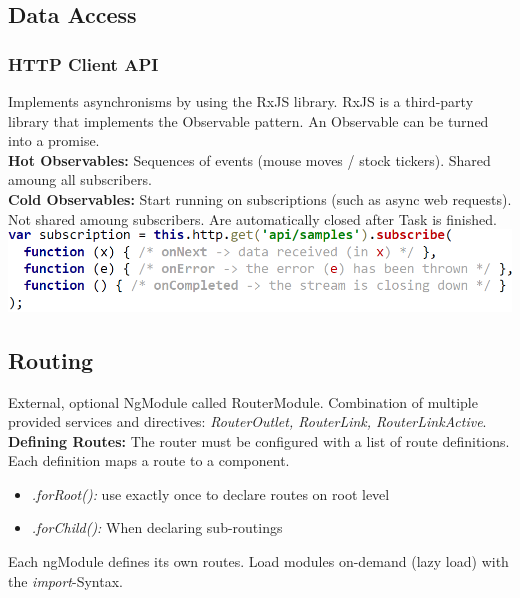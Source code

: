 \subsection{Data Access}
\subsubsection{HTTP Client API}
Implements asynchronisms by using the RxJS library.
RxJS is a third-party library that implements the Observable pattern.
An Observable can be turned into a promise.\\
\textbf{Hot Observables:} Sequences of events (mouse moves / stock tickers).
Shared amoung all subscribers.\\
\textbf{Cold Observables:} Start running on subscriptions (such as async web requests).
Not shared amoung subscribers.
Are automatically closed after Task is finished.\\
\includegraphics[width=0.8\linewidth]{img/angular_observable.png}


\subsection{Routing}
External, optional NgModule called RouterModule.
Combination of multiple provided services and directives: \textit{RouterOutlet, RouterLink, RouterLinkActive}.\\
\textbf{Defining Routes:} The router must be configured with a list of route definitions.
Each definition maps a route to a component.
\begin{itemize}
    \item \textit{.forRoot():} use exactly once to declare routes on root level
    \item \textit{.forChild():} When declaring sub-routings
\end{itemize}
Each ngModule defines its own routes.
Load modules on-demand (lazy load) with the \textit{import}-Syntax.